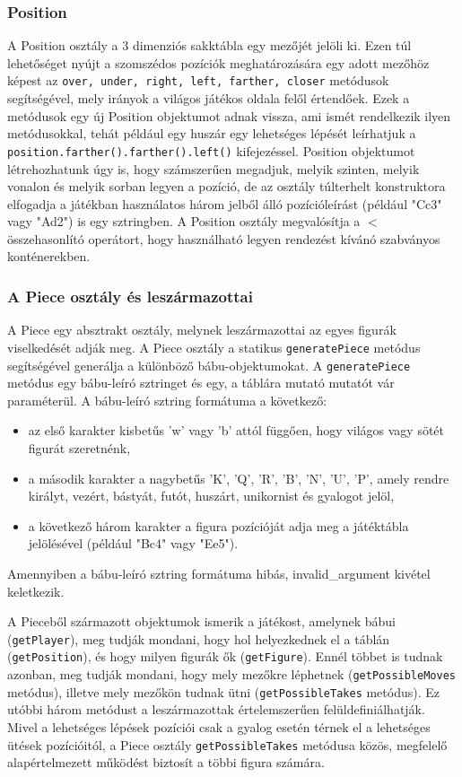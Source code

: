 \documentclass[12pt, twoside]{report}
\begin{document}
\subsubsection{Position}
A Position osztály a 3 dimenziós sakktábla egy mezőjét jelöli ki. Ezen túl lehetőséget nyújt a szomszédos pozíciók meghatározására egy adott mezőhöz képest az {\tt over, under, right, left, farther, closer} metódusok segítségével, mely irányok a világos játékos oldala felől értendőek. Ezek a metódusok egy új Position objektumot adnak vissza, ami ismét rendelkezik ilyen metódusokkal, tehát például egy huszár egy lehetséges lépését leírhatjuk a {\tt position.farther().farther().left()} kifejezéssel. Position objektumot létrehozhatunk úgy is, hogy számszerűen megadjuk, melyik szinten, melyik vonalon és melyik sorban legyen a pozíció, de az osztály túlterhelt konstruktora elfogadja a játékban használatos három jelből álló pozícióleírást (például "Cc3" vagy "Ad2") is egy sztringben. A Position osztály megvalósítja a $<$ összehasonlító operátort, hogy használható legyen rendezést kívánó szabványos konténerekben.

\subsubsection{A Piece osztály és leszármazottai}

A Piece egy absztrakt osztály, melynek leszármazottai  az egyes figurák viselkedését adják meg. A Piece osztály a statikus {\tt generatePiece} metódus segítségével generálja a különböző bábu-objektumokat. A {\tt generatePiece} metódus egy bábu-leíró sztringet és egy, a táblára mutató mutatót vár paraméterül. A bábu-leíró sztring formátuma a következő:
\begin{itemize}
	\item az első karakter kisbetűs 'w' vagy 'b' attól függően, hogy világos vagy sötét figurát szeretnénk,
	\item a második karakter a nagybetűs 'K', 'Q', 'R', 'B', 'N', 'U', 'P', amely rendre királyt, vezért, bástyát, futót, huszárt, unikornist és gyalogot jelöl,
	\item a következő három karakter a figura pozícióját adja meg a játéktábla jelölésével (például "Bc4" vagy "Ee5").
\end{itemize}
Amennyiben a bábu-leíró sztring formátuma hibás, invalid\_argument kivétel keletkezik.

A Pieceből származott objektumok ismerik a játékost, amelynek bábui ({\tt getPlayer}), meg tudják mondani, hogy hol helyezkednek el a táblán ({\tt getPosition}), és hogy milyen figurák ők ({\tt getFigure}). Ennél többet is tudnak azonban, meg tudják mondani, hogy mely mezőkre léphetnek ({\tt getPossibleMoves} metódus), illetve mely mezőkön tudnak ütni ({\tt getPossibleTakes} metódus). Ez utóbbi három metódust a leszármazottak értelemszerűen felüldefiniálhatják. Mivel a lehetséges lépések pozíciói csak a gyalog esetén térnek el a lehetséges ütések pozícióitól, a Piece osztály {\tt getPossibleTakes} metódusa közös, megfelelő alapértelmezett működést biztosít a többi figura számára.
\end{document}
